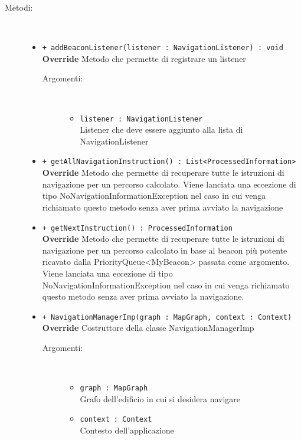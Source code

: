 \documentclass[../DefinizioneDiProdotto.tex]{subfiles}
\begin{document}
\begin{description}
\begin{itemize}
\end{itemize}
\item[Metodi:] \
\begin{itemize}
\item \texttt{+ addBeaconListener(listener : NavigationListener) : void}\\
\textbf{Override} Metodo che permette di registrare un listener
 \begin{description}
\item[Argomenti:] \
\begin{itemize}
\item \texttt{listener : NavigationListener}\\
Listener che deve essere aggiunto alla lista di NavigationListener\end{itemize}
\end{description}
\item \texttt{+ getAllNavigationInstruction() : List<ProcessedInformation>}\\
\textbf{Override} Metodo che permette di recuperare tutte le istruzioni di navigazione per un percorso calcolato. Viene lanciata una eccezione di tipo NoNavigationInformationException nel caso in cui venga richiamato questo metodo senza aver prima avviato la navigazione
 \item \texttt{+ getNextInstruction() : ProcessedInformation}\\
\textbf{Override} Metodo che permette di recuperare tutte le istruzioni di navigazione per un percorso calcolato in base al beacon più potente ricavato dalla PriorityQueue<MyBeacon> passata come argomento. Viene lanciata una eccezione di tipo NoNavigationInformationException nel caso in cui venga richiamato questo metodo senza aver prima avviato la navigazione.
 \item \texttt{+ NavigationManagerImp(graph : MapGraph, context : Context)}\\
\textbf{Override} Costruttore della classe NavigationManagerImp
 \begin{description}
\item[Argomenti:] \
\begin{itemize}
\item \texttt{graph : MapGraph}\\
Grafo dell'edificio in cui si desidera navigare\item \texttt{context : Context}\\
Contesto dell'applicazione\end{itemize}
\end{description}

\end{itemize}
\end{description}
\end{document}
